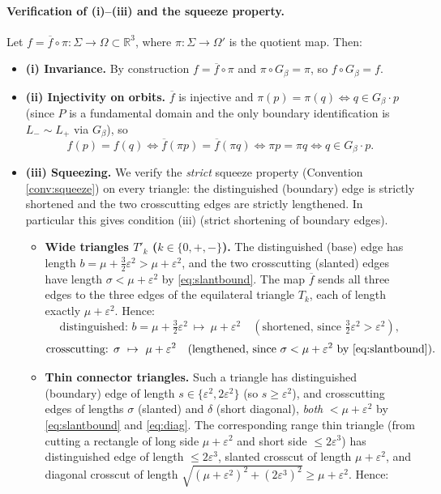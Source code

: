 \documentclass[12pt]{article}
\newcommand{\R}{\mathbb{R}}
\newcommand{\eps}{\varepsilon}
\newcommand{\Sig}{\Sigma}
\begin{document}
\paragraph{Verification of (i)--(iii) and the squeeze property.}
Let $f=\overline f\circ\pi:\Sig\to\Omega\subset\R^3$, where
$\pi:\Sig\to\Omega'$ is the quotient map. Then:
\begin{itemize}
\item \textbf{(i) Invariance.} By construction $f=\overline f\circ\pi$
and $\pi\circ G_\beta=\pi$, so $f\circ G_\beta=f$.
\item \textbf{(ii) Injectivity on orbits.} $\overline f$ is injective and
$\pi(p)=\pi(q)\iff q\in G_\beta\cdot p$ (since $P$ is a fundamental domain
and the only boundary identification is $L_-\sim L_+$ via $G_\beta$), so
\[
f(p)=f(q)\iff\overline f(\pi p)=\overline f(\pi q)\iff\pi p=\pi q\iff
q\in G_\beta\cdot p .
\]
\item \textbf{(iii) Squeezing.} We verify the \emph{strict} squeeze
property (Convention \ref{conv:squeeze}) on every triangle: the
distinguished (boundary) edge is strictly shortened and the two
crosscutting edges are strictly lengthened. In particular this gives
condition (iii) (strict shortening of boundary edges).
\begin{itemize}
\item \textbf{Wide triangles $T'_k$ ($k\in\{0,+,-\}$).} The distinguished
(base) edge has length $b=\mu+\tfrac32\eps^2>\mu+\eps^2$, and the two
crosscutting (slanted) edges have length $\sigma<\mu+\eps^2$ by
\eqref{eq:slantbound}. The map $\overline f$ sends all three edges to the
three edges of the equilateral triangle $T_k$, each of length exactly
$\mu+\eps^2$. Hence:
\[
\text{distinguished: } b=\mu+\tfrac32\eps^2\ \mapsto\ \mu+\eps^2
\quad(\text{shortened, since }\tfrac32\eps^2>\eps^2),
\]
\[
\text{crosscutting: } \sigma\ \mapsto\ \mu+\eps^2
\quad(\text{lengthened, since }\sigma<\mu+\eps^2\text{ by \eqref{eq:slantbound}}).
\]
\item \textbf{Thin connector triangles.} Such a triangle has
distinguished (boundary) edge of length $s\in\{\eps^2,2\eps^2\}$ (so
$s\ge\eps^2$), and crosscutting edges of lengths $\sigma$ (slanted) and
$\delta$ (short diagonal), \emph{both} $<\mu+\eps^2$ by
\eqref{eq:slantbound} and \eqref{eq:diag}. The corresponding range thin
triangle (from cutting a rectangle of long side $\mu+\eps^2$ and short
side $\le2\eps^3$) has distinguished edge of length $\le2\eps^3$, slanted
crosscut of length $\mu+\eps^2$, and diagonal crosscut of length
$\sqrt{(\mu+\eps^2)^2+(2\eps^3)^2}\ge\mu+\eps^2$. Hence:

\end{itemize}
\end{itemize}
\end{document}
